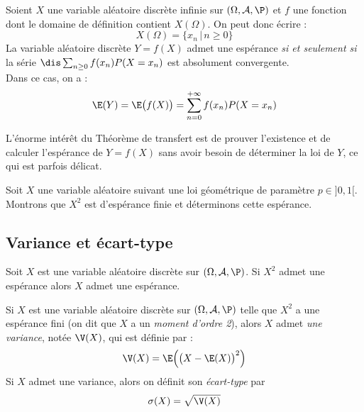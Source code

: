 \documentclass[a4paper,10pt]{report}
\begin{document}
\begin{thm}
Soient $X$ une variable aléatoire discrète infinie sur $(\Omega, \mathcal{A}, \P)$ et $f$ une fonction dont le domaine de définition contient $X(\Omega)$. On peut donc écrire :
$$ X(\Omega) = \lbrace x_n \, \vert \, n \geq 0 \rbrace$$
La variable aléatoire discrète $Y=f(X)$ admet une espérance \textit{si et seulement si} la série \linebreak $\dis \sum_{n \geq 0} f(x_n) P(X=x_n)$ est absolument convergente. \\
Dans ce cas, on a :
\[\E(Y)=\E\big(f(X)\big)= \sum_{n = 0}^{+ \infty} f(x_n) P(X=x_n)\]
\end{thm}

\begin{rem}
L'énorme intérêt du Théorème de transfert est de prouver l'existence et de calculer l'espérance de $Y=f(X)$ sans avoir besoin de déterminer la loi de $Y$, ce qui est parfois délicat.
\end{rem}

\begin{ex} Soit $X$ une variable aléatoire suivant une loi géométrique de paramètre $p \in ]0,1[$. Montrons que $X^2$ est d'espérance finie et déterminons cette espérance.

\vspace{10cm}
\end{ex}


\subsection{Variance et écart-type}
\begin{prop} Soit $X$ est une variable aléatoire discrète sur $(\Omega, \mathcal{A}, \P)$. Si $X^2$ admet une espérance alors $X$ admet une espérance.
\end{prop}

\begin{preuve}

\vspace{6cm}
\end{preuve}

\begin{defip}
Si $X$ est une variable aléatoire discrète sur $(\Omega, \mathcal{A}, \P)$  telle que $X^2$ a une espérance fini (on dit que $X$ a un \textit{moment d'ordre 2}), alors $X$ admet \textit{une variance}, notée $\V(X)$, qui est définie par :
$$\V(X) = \E\Big(\big(X-\E(X)\big)^2\Big)$$
Si $X$ admet une variance, alors on définit son \textit{écart-type} par 
$$\sigma (X) = \sqrt{\V(X)}$$
\end{defip}
\end{document}
